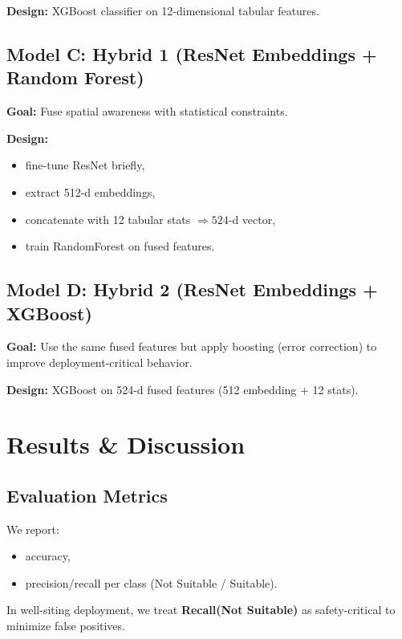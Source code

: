 \documentclass[12pt,a4paper]{report}
\begin{document}
\textbf{Design:} XGBoost classifier on 12-dimensional tabular features.

\section{Model C: Hybrid 1 (ResNet Embeddings + Random Forest)}
\textbf{Goal:} Fuse spatial awareness with statistical constraints.

\textbf{Design:}
\begin{itemize}
  \item fine-tune ResNet briefly,
  \item extract 512-d embeddings,
  \item concatenate with 12 tabular stats \(\Rightarrow 524\)-d vector,
  \item train RandomForest on fused features.
\end{itemize}

\section{Model D: Hybrid 2 (ResNet Embeddings + XGBoost)}
\textbf{Goal:} Use the same fused features but apply boosting (error correction) to improve deployment-critical behavior.

\textbf{Design:} XGBoost on 524-d fused features (512 embedding + 12 stats).


\chapter{Results \& Discussion}

\section{Evaluation Metrics}
We report:
\begin{itemize}
  \item accuracy,
  \item precision/recall per class (Not Suitable / Suitable).
\end{itemize}
In well-siting deployment, we treat \textbf{Recall(Not Suitable)} as safety-critical to minimize false positives.
\end{document}
